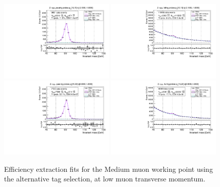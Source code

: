 {\begin{figure}
\centering
\includegraphics[width=0.49\textwidth]{figures/Zmm_AltTag_pass_ptBin0_etaBin1.pdf}
\includegraphics[width=0.49\textwidth]{figures/Zmm_AltTag_fail_ptBin0_etaBin1.pdf}
\includegraphics[width=0.49\textwidth]{figures/Zmm_AltTag_pass_ptBin1_etaBin9.pdf}
\includegraphics[width=0.49\textwidth]{figures/Zmm_AltTag_fail_ptBin1_etaBin9.pdf}
\caption{Efficiency extraction fits for the Medium muon working point using the alternative tag selection, at low muon transverse momentum.}
\label{fig:ZmmAltAltTagFits1}
\end{figure}

}

